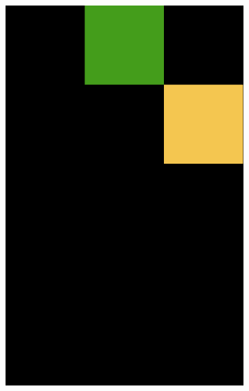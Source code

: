 \begin{figure}[ht]
\begin{subfigure}{0.2\textwidth}
        \includegraphics[width=\textwidth]{TestConflict3.png}
        \label{fig:TestConflict3}
    \end{subfigure}
    \hfill
    \begin{subfigure}{0.2\textwidth}

\end{subfigure}
\end{figure}
